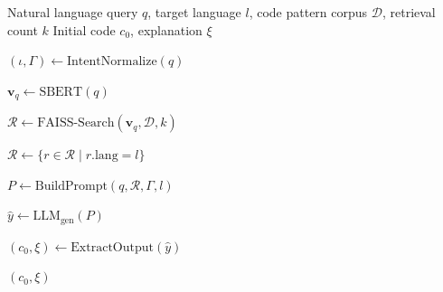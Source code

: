 


\begin{algorithm}[htbp]
\caption{Stage-1: RAG-CodeGen Pipeline}
\label{alg:rag-codegen}
\begin{algorithmic}[1]

\REQUIRE Natural language query $q$, target language $l$, code pattern corpus $\mathcal{D}$, retrieval count $k$
\ENSURE Initial code $c_0$, explanation $\xi$

\STATE $(\iota, \Gamma) \leftarrow \text{IntentNormalize}(q)$

\STATE $\mathbf{v}_q \leftarrow \text{SBERT}(q)$

\STATE $\mathcal{R} \leftarrow \text{FAISS-Search}(\mathbf{v}_q, \mathcal{D}, k)$

\STATE $\mathcal{R} \leftarrow \{r \in \mathcal{R} \mid r.\text{lang} = l\}$

\STATE $P \leftarrow \text{BuildPrompt}(q, \mathcal{R}, \Gamma, l)$

\STATE $\hat{y} \leftarrow \text{LLM}_{\text{gen}}(P)$

\STATE $(c_0, \xi) \leftarrow \text{ExtractOutput}(\hat{y})$

\RETURN $(c_0, \xi)$

\end{algorithmic}
\end{algorithm}



